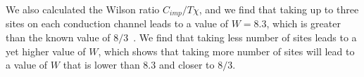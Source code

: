 \documentclass[12pt]{iopart}
\begin{document}
We also calculated the Wilson ratio $C_{imp}/T\chi$, and we find that taking up to three sites on each conduction channel leads to a value of $ W = 8.3$, which is greater than the known value of \(8/3\)~\cite{affleck_1991_overscreen,affleck_ludwig_1991,affleck_pang_cox_1992,affleck1993exact,
parcollet_olivier_large_N,affleck_2005,emery_kivelson,clarke_giamarchi_1993,zarand_2000,
vondelft_prl_1998,schofield_1997,bullaNRGreview,affleck_pang_cox_1992,pang_cox_1991,
andrei_destri_1984,Tsvelick1984,Tsvelick_1985,andrei_jerez_1995,zarand_costi_2002,
sengupta_1994,fabrizio_nozieres_1995,Coleman_tsvelik,fabrizio_gogolin_1995}. We find that taking less number of sites leads to a yet higher value of \(W\), which shows that taking more number of sites will lead to a value of \(W\) that is lower than \(8.3\) and closer to \(8/3\). 
\end{document}
